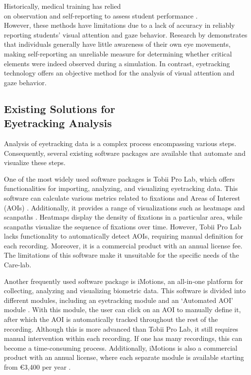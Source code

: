 \documentclass[english]{hogent-article}
\begin{document}
Historically, medical training has relied\\ on observation and self-reporting to assess student performance \autocite{Pauszek2023}.\\
However, these methods have limitations due to a lack of accuracy in reliably reporting students' visual attention and gaze behavior. 
Research by \textcite{Clarke2017} demonstrates that individuals generally have little awareness of their own eye movements, 
making self-reporting an unreliable measure for determining whether critical elements were indeed observed during a simulation. 
In contrast, eyetracking technology offers an objective method for the analysis of visual attention and gaze behavior.

\subsection{Existing Solutions for\\ Eyetracking Analysis}

Analysis of eyetracking data is a complex process encompassing various steps. 
Consequently, several existing software packages are available that automate and visualize these steps.

One of the most widely used software packages is Tobii Pro Lab, which offers functionalities for importing, analyzing, and visualizing eyetracking data.
This software can calculate various metrics related to fixations and Areas of Interest (AOIs) \autocite{Tobii2025a}.
Additionally, it provides a range of visualizations such as heatmaps and scanpaths \autocite{Tobii2025b}. 
Heatmaps display the density of fixations in a particular area, while scanpaths visualize the sequence of fixations over time.
However, Tobii Pro Lab lacks functionality to automatically detect AOIs, requiring manual definition for each recording.
Moreover, it is a commercial product with an annual license fee. 
The limitations of this software make it unsuitable for the specific needs of the Care-lab.

Another frequently used software package is iMotions, an all-in-one platform for collecting, analyzing and visualizing biometric data.
This software is divided into different modules, including an eyetracking module and an `Automated AOI' module \autocite{iMotions2025a}.
With this module, the user can click on an AOI to manually define it, after which the AOI is automatically tracked throughout the rest of the recording.
Although this is more advanced than Tobii Pro Lab, it still requires manual intervention within each recording. If one has many recordings, this can become a time-consuming process.
Additionally, iMotions is also a commercial product with an annual license, where each separate module is available starting from €3,400 per year \autocite{iMotions2025b}.
\end{document}
